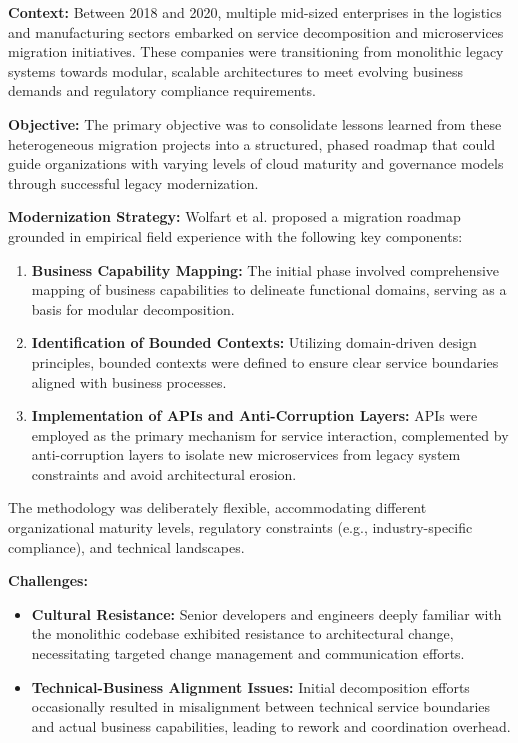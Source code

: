 \documentclass[12pt]{article}
\begin{document}
\textbf{Context:}  
Between 2018 and 2020, multiple mid-sized enterprises in the logistics and manufacturing sectors embarked on service decomposition and microservices migration initiatives. These companies were transitioning from monolithic legacy systems towards modular, scalable architectures to meet evolving business demands and regulatory compliance requirements.

\textbf{Objective:}  
The primary objective was to consolidate lessons learned from these heterogeneous migration projects into a structured, phased roadmap that could guide organizations with varying levels of cloud maturity and governance models through successful legacy modernization.

\textbf{Modernization Strategy:}  
Wolfart et al. proposed a migration roadmap grounded in empirical field experience with the following key components:

\begin{enumerate}
    \item \textbf{Business Capability Mapping:} The initial phase involved comprehensive mapping of business capabilities to delineate functional domains, serving as a basis for modular decomposition.
    \item \textbf{Identification of Bounded Contexts:} Utilizing domain-driven design principles, bounded contexts were defined to ensure clear service boundaries aligned with business processes.
    \item \textbf{Implementation of APIs and Anti-Corruption Layers:} APIs were employed as the primary mechanism for service interaction, complemented by anti-corruption layers to isolate new microservices from legacy system constraints and avoid architectural erosion.
\end{enumerate}

The methodology was deliberately flexible, accommodating different organizational maturity levels, regulatory constraints (e.g., industry-specific compliance), and technical landscapes.

\textbf{Challenges:}  
\begin{itemize}
    \item \textbf{Cultural Resistance:} Senior developers and engineers deeply familiar with the monolithic codebase exhibited resistance to architectural change, necessitating targeted change management and communication efforts.
    \item \textbf{Technical-Business Alignment Issues:} Initial decomposition efforts occasionally resulted in misalignment between technical service boundaries and actual business capabilities, leading to rework and coordination overhead.
\end{itemize}
\end{document}
